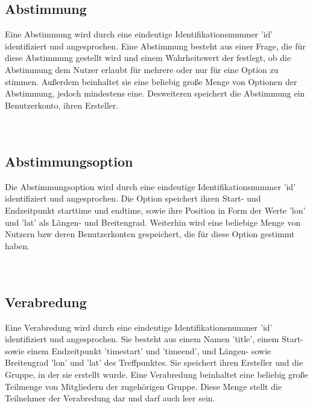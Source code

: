 \documentclass[parskip=full,11pt]{scrartcl}
\begin{document}
\pagebreak


\subsection{Abstimmung}
Eine Abstimmung wird durch eine eindeutige Identifikationsnummer 'id'
identifiziert und angesprochen.
Eine Abstimmung besteht aus einer Frage, die für diese Abstimmung gestellt wird
und einem Wahrheitswert der festlegt,
ob die Abstimmung dem Nutzer erlaubt für mehrere oder nur für eine Option zu
stimmen.
Außerdem beinhaltet sie eine beliebig große Menge von Optionen der Abstimmung,
jedoch mindestens eine.
Desweiteren speichert die Abstimmung ein Benutzerkonto, ihren Ersteller.
\\
\\
\\

\pagebreak


\subsection{Abstimmungsoption}
Die Abstimmungsoption wird durch eine eindeutige Identifikationsnummer 'id'
identifiziert und angesprochen.
Die Option speichert ihren Start- und Endzeitpunkt starttime und endtime,
sowie ihre Position in Form der Werte 'lon' und 'lat' als Längen- und
Breitengrad.
Weiterhin wird eine beliebige Menge von Nutzern bzw deren Benutzerkonten
gespeichert, die für diese Option gestimmt haben.
\\
\\
\\

\pagebreak


\subsection{Verabredung}
Eine Verabredung wird durch eine eindeutige Identifikationsnummer 'id'
identifiziert und angesprochen. Sie besteht aus einem Namen 'title', einem
Start- sowie einem Endzeitpunkt 'timestart' und 'timeend',
und Längen- sowie Breitengrad 'lon' und 'lat' des Treffpunktes. Sie speichert
ihren Ersteller und die Gruppe, in der sie erstellt wurde.
Eine Verabredung beinhaltet eine beliebig große Teilmenge von Mitgliedern der
zugehörigen Gruppe.
Diese Menge stellt die Teilnehmer der Verabredung dar und darf auch leer sein.
\\
\\
\\
\end{document}

